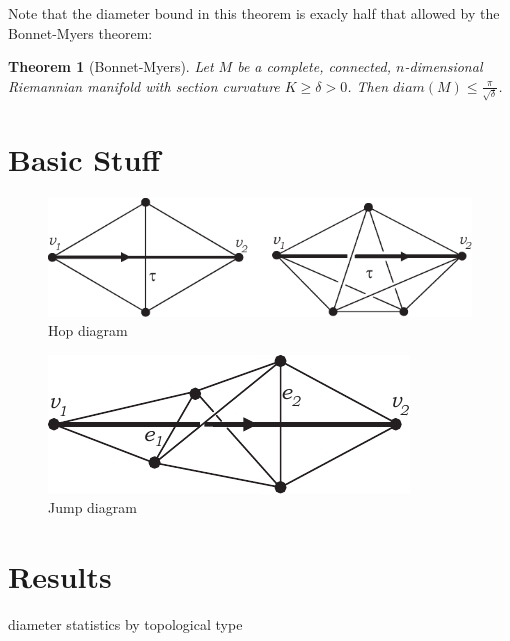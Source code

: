\documentclass[12pt]{article}
\newtheorem{thm}{Theorem}[section]
\begin{document}
\noindent Note that the diameter bound in this theorem is exacly half that allowed by the Bonnet-Myers theorem:

\begin{thm}[Bonnet-Myers] Let $M$ be a complete, connected, $n$-dimensional Riemannian manifold with section curvature $K \geq \delta > 0$. Then $diam(M) \leq \frac{\pi}{\sqrt{\delta}}$.
\end{thm}

\section{Basic Stuff}
\label{sect:basics}

\begin{figure}
    \begin{center}
        \includegraphics[width=0.6\linewidth]{figures/hops.pdf}
        \caption{Hop diagram}
    \end{center}
\end{figure}


\begin{figure}
    \begin{center}
        \includegraphics[width=0.6\linewidth]{figures/jump.pdf}
        \caption{Jump diagram}
    \end{center}
\end{figure}
\section{Results}

diameter statistics by topological type
\end{document}
